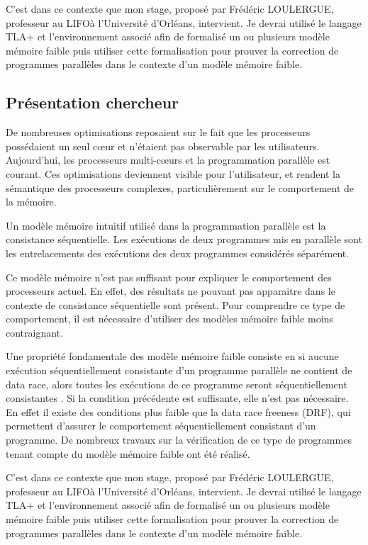 \documentclass[12pt,a4paper]{article}
\begin{document}
C'est dans ce contexte que mon stage, proposé par Frédéric LOULERGUE, professeur au LIFO\footnotemark[1] à l'Université d'Orléans, intervient. Je devrai utilisé le langage TLA+ \cite{Lamport:2002:SST:579617} et l'environnement associé afin de formalisé un ou plusieurs modèle mémoire faible puis utiliser cette formalisation pour prouver la correction de programmes parallèles dans le contexte d'un modèle mémoire faible. 

\subsection{Présentation chercheur}
De nombreuses optimisations reposaient sur le fait que les processeurs possédaient un seul cœur et n'étaient pas observable par les utilisateurs.
Aujourd'hui, les processeurs multi-cœurs et la programmation parallèle est courant. Ces optimisations deviennent visible pour l'utilisateur, et rendent la sémantique des processeurs complexes, particulièrement sur le comportement de la mémoire.

Un modèle mémoire intuitif utilisé dans la programmation parallèle est la consistance séquentielle. Les exécutions de deux programmes mis en parallèle sont les entrelacements des exécutions des deux programmes considérés séparément.
 
Ce modèle mémoire n'est pas suffisant pour expliquer le comportement des processeurs actuel. En effet, des résultats ne pouvant pas apparaitre dans le contexte de consistance séquentielle sont présent. Pour comprendre ce type de comportement, il est nécessaire d'utiliser des modèles mémoire faible\cite{Adve:1996:SMC:619013.620590} moins contraignant. 

Une propriété fondamentale des modèle mémoire faible consiste en si aucune exécution séquentiellement consistante d'un programme parallèle ne contient de data race, alors toutes les exécutions de ce programme seront séquentiellement consistantes \cite{Saraswat:2007:TMM:1229428.1229469}.
Si la condition précédente est suffisante, elle n'est pas nécessaire. En effet il existe des conditions plus faible que la data race freeness (DRF), qui permettent d'assurer le comportement séquentiellement consistant d'un programme. De nombreux travaux sur la vérification de ce type de programmes tenant compte du modèle mémoire faible ont été réalisé.

C'est dans ce contexte que mon stage, proposé par Frédéric LOULERGUE, professeur au LIFO\footnotemark[1] à l'Université d'Orléans, intervient. Je devrai utilisé le langage TLA+ \cite{Lamport:2002:SST:579617} et l'environnement associé afin de formalisé un ou plusieurs modèle mémoire faible puis utiliser cette formalisation pour prouver la correction de programmes parallèles dans le contexte d'un modèle mémoire faible.
 
\end{document}
